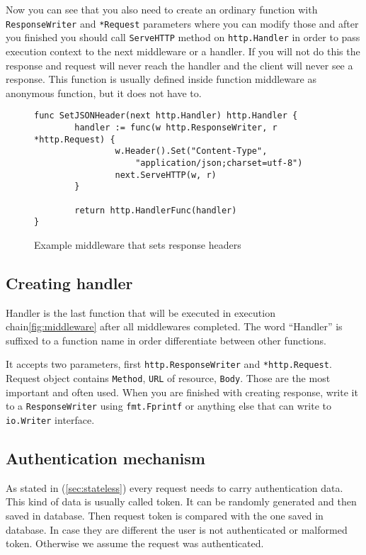 Now you can see that you also need to create an ordinary function with\\ \verb|ResponseWriter| and \verb|*Request| parameters where you can modify those and after you finished you should call \verb|ServeHTTP| method on \verb|http.Handler| in order to pass execution context to the next middleware or a handler. If you will not do this the response and request will never reach the handler and the client will never see a response. This function is usually defined inside function middleware as anonymous function, but it does not have to.

\begin{figure}[!htbp]
\begin{verbatim}
func SetJSONHeader(next http.Handler) http.Handler {
        handler := func(w http.ResponseWriter, r *http.Request) {
                w.Header().Set("Content-Type",
                    "application/json;charset=utf-8")
                next.ServeHTTP(w, r)
        }

        return http.HandlerFunc(handler)
}
\end{verbatim}
\renewcommand\figurename{Code}
\caption{Example middleware that sets response headers}
\label{src:example-middleware}
\end{figure}

\subsection{Creating handler}
Handler is the last function that will be executed in execution chain\ref{fig:middleware} after all middlewares completed. The word ``Handler'' is suffixed to a function name in order differentiate between other functions.

It accepts two parameters, first \verb|http.ResponseWriter| and \verb|*http.Request|. Request object contains \verb|Method|, \verb|URL| of resource, \verb|Body|. Those are the most important and often used. When you are finished with creating response, write it to a \verb|ResponseWriter| using \verb|fmt.Fprintf| or anything else that can write to \verb|io.Writer| interface.

\subsection{Authentication mechanism}
As stated in (\ref{sec:stateless}) every request needs to carry authentication data. This kind of data is usually called token. It can be randomly generated and then saved in database. Then request token is compared with the one saved in database. In case they are different the user is not authenticated or malformed token. Otherwise we assume the request was authenticated.

